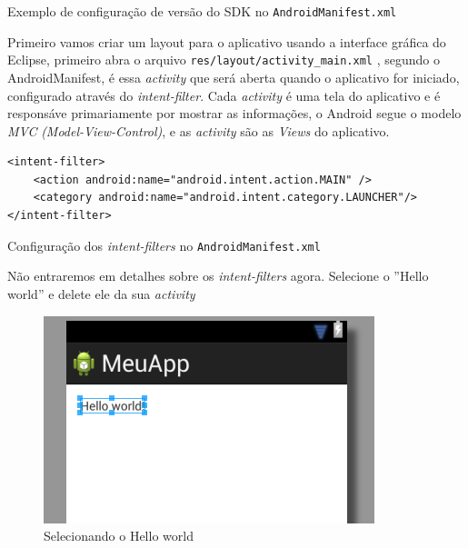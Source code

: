 \documentclass[a4paper,12pt,brazil,doubleside]{book}
\begin{document}
\begin{singlespace}
\begin{listing}[H]
\inputminted[linenos=true,fontsize=\small,frame=lines, framesep=2mm, tabsize=2,numbersep=5pt]{xml}{src/firstapp/sdk-manifest.xml}
\label{AndroidManifest.sdk}
\caption{Exemplo de configuração de versão do SDK no \texttt{\textcolor{mygreen}{AndroidManifest.xml}} }
\end{listing}

Primeiro vamos criar um layout para o aplicativo usando a interface gráfica do Eclipse, primeiro abra o arquivo \texttt{\textcolor{mygreen}{res/layout/activity\_main.xml}} , segundo o AndroidManifest, é essa \emph{activity} que será aberta quando o aplicativo for iniciado, configurado através do \textit{intent-filter}. Cada \emph{activity} é uma tela do aplicativo e é responsáve primariamente por mostrar as informações, o Android segue o modelo \emph{MVC} \textit{(Model-View-Control)}, e as \emph{activity} são as \textit{Views} do aplicativo.
\begin{listing}
\begin{verbatim}
<intent-filter>
	<action android:name="android.intent.action.MAIN" />
	<category android:name="android.intent.category.LAUNCHER"/>
</intent-filter>
\end{verbatim}
\caption{Configuração dos \textit{intent-filters} no \texttt{\textcolor{mygreen}{AndroidManifest.xml}} }
\end{listing}

Não entraremos em detalhes sobre os \textit{intent-filters} agora. Selecione o ''Hello world'' e delete ele da sua \emph{activity}

\begin{figure}[H]
  \centering
  \includegraphics{figuras/3-criando-app.png}
  \caption{Selecionando o Hello world}
  \label{fig:b}
\end{figure}


\end{singlespace}
\end{document}
